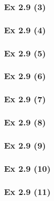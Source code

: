 \subsubsection{Ex 2.9 (3)}\label{sec:Ex_2.9.3}

\subsubsection{Ex 2.9 (4)}\label{sec:Ex_2.9.4}

\subsubsection{Ex 2.9 (5)}\label{sec:Ex_2.9.5}

\subsubsection{Ex 2.9 (6)}\label{sec:Ex_2.9.6}

\subsubsection{Ex 2.9 (7)}\label{sec:Ex_2.9.7}

\subsubsection{Ex 2.9 (8)}\label{sec:Ex_2.9.8}

\subsubsection{Ex 2.9 (9)}\label{sec:Ex_2.9.9}

\subsubsection{Ex 2.9 (10)}\label{sec:Ex_2.9.10}

\subsubsection{Ex 2.9 (11)}\label{sec:Ex_2.9.11}


